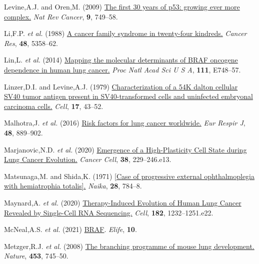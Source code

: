 \begin{CSLReferences}{1}{0}
\leavevmode{}%
Levine,A.J. and Oren,M. (2009) \href{https://doi.org/10.1038/nrc2723}{The first 30 years of p53: growing ever more complex.} \emph{Nat Rev Cancer}, \textbf{9}, 749--58.

\leavevmode{}%
Li,F.P. \emph{et al.} (1988) \href{https://www.ncbi.nlm.nih.gov/pubmed/3409256}{A cancer family syndrome in twenty-four kindreds.} \emph{Cancer Res}, \textbf{48}, 5358--62.

\leavevmode{}%
Lin,L. \emph{et al.} (2014) \href{https://doi.org/10.1073/pnas.1320956111}{Mapping the molecular determinants of BRAF oncogene dependence in human lung cancer.} \emph{Proc Natl Acad Sci U S A}, \textbf{111}, E748--57.

\leavevmode{}%
Linzer,D.I. and Levine,A.J. (1979) \href{https://doi.org/10.1016/0092-8674(79)90293-9}{Characterization of a 54K dalton cellular SV40 tumor antigen present in SV40-transformed cells and uninfected embryonal carcinoma cells.} \emph{Cell}, \textbf{17}, 43--52.

\leavevmode{}%
Malhotra,J. \emph{et al.} (2016) \href{https://doi.org/10.1183/13993003.00359-2016}{Risk factors for lung cancer worldwide.} \emph{Eur Respir J}, \textbf{48}, 889--902.

\leavevmode{}%
Marjanovic,N.D. \emph{et al.} (2020) \href{https://doi.org/10.1016/j.ccell.2020.06.012}{Emergence of a High-Plasticity Cell State during Lung Cancer Evolution.} \emph{Cancer Cell}, \textbf{38}, 229--246.e13.

\leavevmode{}%
Matsunaga,M. and Shida,K. (1971) \href{https://www.ncbi.nlm.nih.gov/pubmed/5130083}{{[}Case of progressive external ophthalmoplegia with hemiatrophia totalis{]}.} \emph{Naika}, \textbf{28}, 784--8.

\leavevmode{}%
Maynard,A. \emph{et al.} (2020) \href{https://doi.org/10.1016/j.cell.2020.07.017}{Therapy-Induced Evolution of Human Lung Cancer Revealed by Single-Cell RNA Sequencing.} \emph{Cell}, \textbf{182}, 1232--1251.e22.

\leavevmode{}%
McNeal,A.S. \emph{et al.} (2021) \href{https://doi.org/10.7554/elife.70385}{BRAF}. \emph{Elife}, \textbf{10}.

\leavevmode{}%
Metzger,R.J. \emph{et al.} (2008) \href{https://doi.org/10.1038/nature07005}{The branching programme of mouse lung development.} \emph{Nature}, \textbf{453}, 745--50.


\end{CSLReferences}
